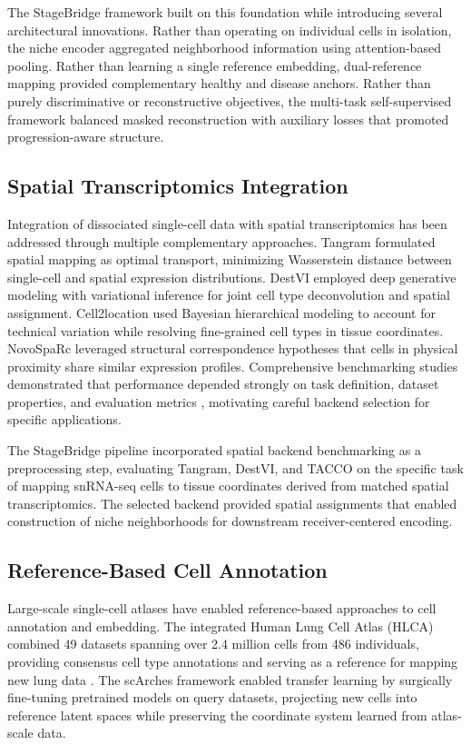 The StageBridge framework built on this foundation while introducing several architectural innovations. Rather than operating on individual cells in isolation, the niche encoder aggregated neighborhood information using attention-based pooling. Rather than learning a single reference embedding, dual-reference mapping provided complementary healthy and disease anchors. Rather than purely discriminative or reconstructive objectives, the multi-task self-supervised framework balanced masked reconstruction with auxiliary losses that promoted progression-aware structure.


\subsection{Spatial Transcriptomics Integration}

Integration of dissociated single-cell data with spatial transcriptomics has been addressed through multiple complementary approaches. Tangram \cite{Biancalani2021-bt} formulated spatial mapping as optimal transport, minimizing Wasserstein distance between single-cell and spatial expression distributions. DestVI \cite{Lopez2022-ps} employed deep generative modeling with variational inference for joint cell type deconvolution and spatial assignment. Cell2location \cite{Kleshchevnikov2022-ki} used Bayesian hierarchical modeling to account for technical variation while resolving fine-grained cell types in tissue coordinates. NovoSpaRc \cite{Moriel2021-wu} leveraged structural correspondence hypotheses that cells in physical proximity share similar expression profiles. Comprehensive benchmarking studies demonstrated that performance depended strongly on task definition, dataset properties, and evaluation metrics \cite{Li2022-uy}, motivating careful backend selection for specific applications.

The StageBridge pipeline incorporated spatial backend benchmarking as a preprocessing step, evaluating Tangram, DestVI, and TACCO on the specific task of mapping snRNA-seq cells to tissue coordinates derived from matched spatial transcriptomics. The selected backend provided spatial assignments that enabled construction of niche neighborhoods for downstream receiver-centered encoding.


\subsection{Reference-Based Cell Annotation}

Large-scale single-cell atlases have enabled reference-based approaches to cell annotation and embedding. The integrated Human Lung Cell Atlas (HLCA) combined 49 datasets spanning over 2.4 million cells from 486 individuals, providing consensus cell type annotations and serving as a reference for mapping new lung data \cite{Sikkema2023-dr}. The scArches framework enabled transfer learning by surgically fine-tuning pretrained models on query datasets, projecting new cells into reference latent spaces while preserving the coordinate system learned from atlas-scale data.

